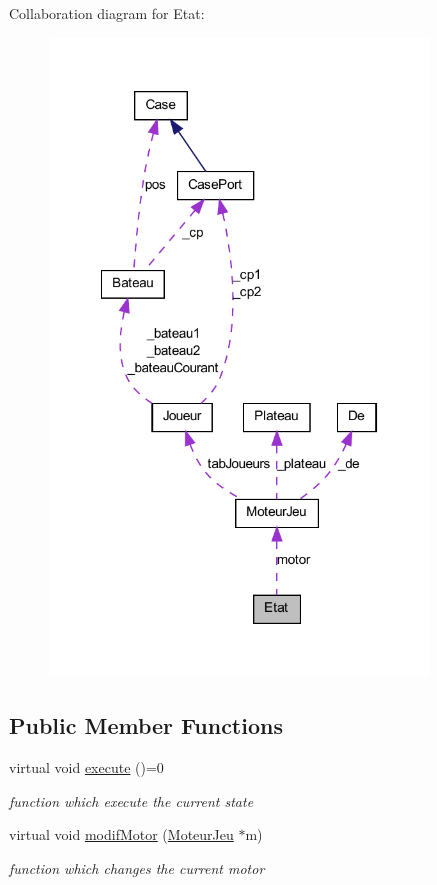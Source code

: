 Collaboration diagram for Etat:
\nopagebreak
\begin{figure}[H]
\begin{center}
\leavevmode
\includegraphics[width=285pt]{class_etat__coll__graph}
\end{center}
\end{figure}
\subsection*{Public Member Functions}
\begin{DoxyCompactItemize}
\item 
\hypertarget{class_etat_a1477a7c7ea143ead43f531b54369101c}{
virtual void \hyperlink{class_etat_a1477a7c7ea143ead43f531b54369101c}{execute} ()=0}
\label{class_etat_a1477a7c7ea143ead43f531b54369101c}

\begin{DoxyCompactList}\small\item\em function which execute the current state \item\end{DoxyCompactList}\item 
virtual void \hyperlink{class_etat_a6a7c179e98f044ae009926097cf00e22}{modifMotor} (\hyperlink{class_moteur_jeu}{MoteurJeu} $\ast$m)
\begin{DoxyCompactList}\small\item\em function which changes the current motor \item\end{DoxyCompactList}\end{DoxyCompactItemize}

